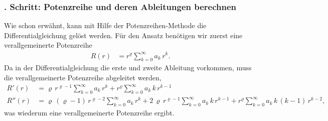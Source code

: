 \subsubsection{. Schritt: Potenzreihe und deren Ableitungen berechnen}
Wie schon erw\"ahnt,
kann mit Hilfe der Potenzreihen-Methode die Differentialgleichung  gel\"ost werden.
F\"ur den Ansatz ben\"otigen wir zuerst eine verallgemeinerte Potenzreihe
\begin{align}
	R \left( r \right)
	&=
	r^{\varrho}
	\sum_{k=0}^{\infty} a_k \, r^k .
	\label{eq:bessel:potenzreihe:verallgemeinert}
\end{align}
Da in der Differentialgleichung die erste und zweite Ableitung vorkommen,
muss die verallgemeinerte Potenzreihe abgeleitet werden,
\begin{align}
	R'\left( r \right)
	&=
	\varrho \, r^{\varrho - 1}
	\sum_{k=0}^{\infty} a_k \, r^k
	+
	r^{\varrho}
	\sum_{k=0}^{\infty} a_k \, k \, r^{k - 1}
	\label{eq:bessel:potenzreihe:ersteableitung}
\\
	R'' \left( r \right)
	&=
	\varrho \, \left( \varrho - 1 \right) \, r^{\varrho - 2}
	\sum_{k=0}^{\infty} a_k \, r^k
	+
	2 \, \varrho \, r^{\varrho - 1}
	\sum_{k=0}^{\infty} a_k \, k \, r^{k - 1}
	+
	r^{\varrho}
	\sum_{k=0}^{\infty} a_k \, k \, \left( k - 1 \right) \, r^{k - 2}	
	\label{eq:bessel:potenzreihe:zweiteableitung}
	\text{,}
\end{align}
was wiederum eine verallgemeinerte Potenzreihe ergibt.
